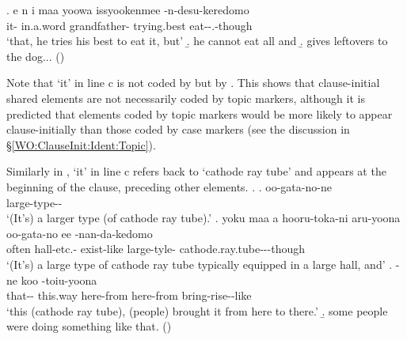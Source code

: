  \bg. e n  i maa yoowa  issyookenmee -n-desu-keredomo \\
     it-   in.a.word grandfather- trying.best eat--.-though \\
   `that, he tries his best to eat it, but'
 \b. he cannot eat all and
 \b. gives leftovers to the dog...
  \hfill{()}
%

Note that  `it' in line c is not coded by  but by .
This shows that clause-initial shared elements are not necessarily coded by topic markers,
although it is predicted that elements coded by topic markers would be more likely to appear clause-initially than those coded by case markers (see the discussion in \S \ref{WO:ClauseInit:Ident:Topic}).

Similarly in \Next,
 `it' in line c refers back to  `cathode ray tube'
and appears at the beginning of the clause,
preceding other elements.
%
\ex.\label{PronIni2}
 \ag. oo-gata-no-ne \\
   large-type-- \\
   `(It's) a larger type (of cathode ray tube).'
 \bg. yoku maa a hooru-toka-ni aru-yoona oo-gata-no ee {}-nan-da-kedomo \\
   often   hall-etc.- exist-like large-tyle-  cathode.ray.tube---though \\
   `(It's) a large type of cathode ray tube typically equipped in a large hall, and'
 \bg. -ne koo   -toiu-yoona \\
  that-- this.way here-from here-from bring-rise--like \\
  `this (cathode ray tube), (people) brought it from here to there.'
  \b. some people were doing something like that.
   \hfill{()}

